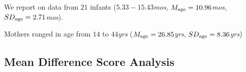 \documentclass[
  doc,floatsintext]{apa6}
\newenvironment{Shaded}{\begin{snugshade}}{\end{snugshade}}
\newcommand{\AttributeTok}[1]{\textcolor[rgb]{0.13,0.29,0.53}{#1}}
\newcommand{\FunctionTok}[1]{\textcolor[rgb]{0.13,0.29,0.53}{\textbf{#1}}}
\newcommand{\NormalTok}[1]{#1}
\newcommand{\OtherTok}[1]{\textcolor[rgb]{0.56,0.35,0.01}{#1}}
\newcommand{\SpecialCharTok}[1]{\textcolor[rgb]{0.81,0.36,0.00}{\textbf{#1}}}
\begin{document}
We report on data from \(21\) infants (\(5.33-15.43\)\textit{mos}, \(M_\textnormal{age}=10.96\)\textit{mos}, \(SD_\textnormal{age}=2.71\)\textit{mos}).

\begin{Shaded}
\end{Shaded}

Mothers ranged in age from \(14\) to \(44\)\textit{yrs} (\(M_\textnormal{age}=26.85\)\textit{yrs}, \(SD_\textnormal{age}=8.36\)\textit{yrs})

\subsection{Mean Difference Score Analysis}\label{mean-difference-score-analysis}
\end{document}
